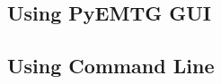 \documentclass[11pt]{article}
\begin{document}
\subsection{Using PyEMTG GUI}



\subsection{Using Command Line}
\label{sec:executing_emtg_without_pyemtg}




%
%
\end{document}
